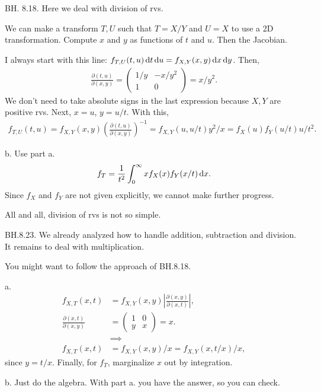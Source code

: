 \begin{exercise}
BH. 8.18. Here we deal with division of rvs.
\begin{hint} We can make a transform $T, U$ such that $T=X/Y$ and $U=X$  to use a 2D transformation. Compute $x$ and $y$ as functions of $t$ and $u$. Then the Jacobian.
\end{hint}
\begin{solution}
I always start with this line: $f_{T,U}(t,u) \,\textrm{d}t \,\textrm{d}u = f_{X,Y}(x,y) \,\textrm{d}x \,\textrm{d}y$.
Then,
\begin{align*}
\frac{\partial (t, u)}{\partial (x,y)} =
  \begin{pmatrix}
1/y & -x/y^{2} \\
    1 & 0
  \end{pmatrix} = x/y^{2}.
\end{align*}
We don't need to take absolute signs in the last expression because $X, Y$ are positive rvs.
Next, $x=u$, $y=u/t$. With this,
\begin{align*}
  f_{T,U}(t,u) = f_{X,Y}(x,y) \left(\frac{\partial (t, u)}{\partial (x,y)}\right)^{-1} = f_{X,Y}(u,u/t) y^{2}/x = f_X(u)f_Y(u/t) u/t^{2}.
\end{align*}

b. Use part a.
\begin{align*}
f_{T} = \frac 1{t^2} \int_0^{\infty} x f_X(x) f_Y(x/t) \,\textrm{d}x.
\end{align*}
Since $f_X$ and $f_Y$ are not given explicitly, we cannot make further progress.

All and all, division of rvs is not so simple.
\end{solution}
\end{exercise}

\begin{exercise}
BH.8.23. We already analyzed how to handle addition, subtraction and division. It remains to deal with multiplication.
\begin{hint}
You might want to follow the approach of BH.8.18.
\end{hint}
\begin{solution}
a.
\begin{align*}
f_{X,T}(x,t) &= f_{X,Y}(x,y) |\frac{\partial (x,y)}{\partial (x, t)}|, \\
\frac{\partial (x,t)}{\partial (x,y)} &=
  \begin{pmatrix}
    1 & 0 \\
y & x
  \end{pmatrix} = x. \\
&\implies \\
f_{X,T}(x,t) &= f_{X,Y}(x,y)/x= f_{X,Y}(x,t/x)/x,
\end{align*}
since $y=t/x$. Finally, for $f_T$, marginalize $x$ out by integration.

b. Just do the algebra. With part a. you have the answer, so you can check.
\end{solution}
\end{exercise}

